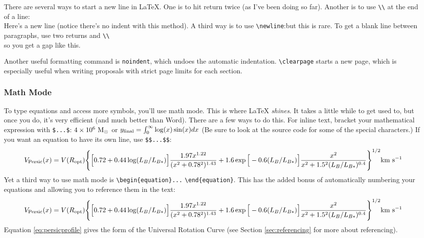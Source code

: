 \documentclass[onecolumn,12pt]{aastex62}
\begin{document}
There are several ways to start a new line in LaTeX. One is to hit return twice (as I've been doing so far). Another is to use \verb|\\| at the end of a line:\\Here's a new line (notice there's no indent with this method). A third way is to use \verb|\newline|:\newline but this is rare.  To get a blank line between paragraphs, use two returns and \verb|\\|\\

so you get a gap like this.

\noindent Another useful formatting command is \verb|noindent|, which undoes the automatic indentation. \verb|\clearpage| starts a new page, which is especially useful when writing proposals with strict page limits for each section.

\subsubsection{Math Mode}
\label{sssec:mathmode}
To type equations and access more symbols, you'll use math mode. This is where LaTeX \textit{shines}. It takes a little while to get used to, but once you do, it's very efficient (and much better than Word). There are a few ways to do this. For inline text, bracket your mathematical expression with \verb|$...$|: $4\times10^{6}~{\rm M}_\odot$ or $y_{\rm{final}} = \int_0^\infty \log(x)\sin(x)dx$ (Be sure to look at the source code for some of the special characters.) If you want an equation to have its own line, use \verb|$$...$$|:
$$ V_{\rm Persic}(x) = V(R_{\rm opt})\Bigg \{\Big[0.72+0.44\log(L_B/L_{B*})\Big]\frac{1.97x^{1.22}}{(x^2+0.78^2)^{1.43}}+1.6\exp{\Big[-0.6(L_B/L_{B*})\Big]\frac{x^2}{x^2+1.5^2(L_B/L_{B*})^{0.4}}} \Bigg\}^{1/2} {\rm km\ s^{-1}} $$
Yet a third way to use math mode is \verb|\begin{equation}...| \verb|\end{equation}|. This has the added bonus of automatically numbering your equations and allowing you to reference them in the text:
\begin{equation}
\label{eq:persicprofile}
     V_{\rm Persic}(x) = V(R_{\rm opt})\Bigg \{\Big[0.72+0.44\log(L_B/L_{B*})\Big]\frac{1.97x^{1.22}}{(x^2+0.78^2)^{1.43}}+1.6\exp{\Big[-0.6(L_B/L_{B*})\Big]\frac{x^2}{x^2+1.5^2(L_B/L_{B*})^{0.4}}} \Bigg\}^{1/2} {\rm km\ s^{-1}}
\end{equation}
Equation \ref{eq:persicprofile} gives the form of the Universal Rotation Curve \citep{persic96} (see Section \ref{sec:referencing} for more about referencing).
\end{document}
